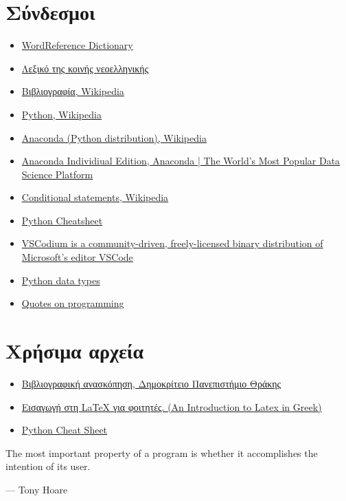 \documentclass[14pt]{extreport}
\begin{document}
\section{Σύνδεσμοι}
\begin{itemize}\itemsep0cm
    \item \href{https://tinyurl.com/yyzfa2bg}{WordReference Dictionary}
    \item \href{https://tinyurl.com/o5vxal7}{Λεξικό της κοινής νεοελληνικής}
    \item \href{https://tinyurl.com/y9q2elk4}{Βιβλιογραφία, Wikipedia}
    \item \href{https://tinyurl.com/y9g9nkh2}{Python, Wikipedia}
    \item \href{https://tinyurl.com/ycy6jsw5}{Anaconda (Python distribution),
              Wikipedia}
    \item \href{https://tinyurl.com/y7rogsec}{Anaconda Individiual Edition,
              Anaconda | The World's Most Popular Data Science Platform}
    \item \href{https://tinyurl.com/ogoqf2p}{Conditional statements, Wikipedia}
    \item \href{https://tinyurl.com/y8y59y44}{Python Cheatsheet}
    \item \href{https://tinyurl.com/y54gclet}{VSCodium is a community-driven,
              freely-licensed binary distribution of Microsoft’s editor VSCode}
    \item \href{https://www.tutorialsteacher.com/python/python-data-types}{Python data types}
    \item \href{https://www.goodreads.com/quotes/tag/programming}{Quotes on programming}
\end{itemize}
\section{Χρήσιμα αρχεία}
\begin{itemize}\itemsep0cm
    \item \href{https://tinyurl.com/y9l8o5n6}{Βιβλιογραφική ανασκόπηση,
              Δημοκρίτειο Πανεπιστήμιο Θράκης}
    \item \href{https://tinyurl.com/yaaswz5p}{Εισαγωγή στη LaTeX για φοιτητές.
              (An Introduction to Latex in Greek)}
    \item \href{https://tinyurl.com/nqbrvss}{Python Cheat Sheet}
\end{itemize}

\epigraph{The most important property of a program is whether it accomplishes the intention of its user.}{--- Tony Hoare}
\end{document}
